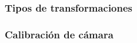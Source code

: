 \begin{frame}
	\frametitle{Tipos de transformaciones}
	\footnotesize
	
\end{frame}

\begin{frame}
	\frametitle{Calibración de cámara}
	\footnotesize
	
	
\end{frame}



